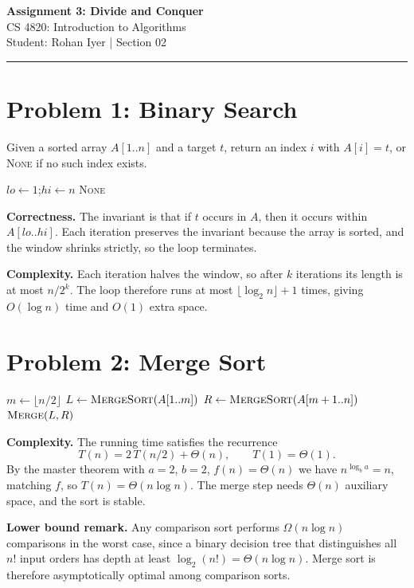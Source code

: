 \documentclass[11pt]{article}
\begin{document}
\begin{center}
  {\Large\bfseries Assignment 3: Divide and Conquer}\\[3pt]
  {\large CS 4820: Introduction to Algorithms}\\[3pt]
  Student: Rohan Iyer \quad | \quad Section 02
\end{center}

{\color{accent}\rule{\linewidth}{1.2pt}}

\section*{Problem 1: Binary Search}

Given a sorted array $A[1..n]$ and a target $t$, return an index $i$ with
$A[i] = t$, or \textsc{None} if no such index exists.

\begin{algorithm}[h]
\caption{\textsc{BinarySearch}$(A, t)$}
$lo \leftarrow 1$;\quad $hi \leftarrow n$\;
\Return \textsc{None}\;
\end{algorithm}

\textbf{Correctness.} The invariant is that if $t$ occurs in $A$, then it
occurs within $A[lo..hi]$. Each iteration preserves the invariant because
the array is sorted, and the window shrinks strictly, so the loop
terminates.

\textbf{Complexity.} Each iteration halves the window, so after $k$
iterations its length is at most $n / 2^{k}$. The loop therefore runs at
most $\lfloor \log_2 n \rfloor + 1$ times, giving $O(\log n)$ time and
$O(1)$ extra space.

\section*{Problem 2: Merge Sort}

\begin{algorithm}[h]
\caption{\textsc{MergeSort}$(A)$}
$m \leftarrow \lfloor n/2 \rfloor$\;
$L \leftarrow \textsc{MergeSort}(A[1..m])$\;
$R \leftarrow \textsc{MergeSort}(A[m+1..n])$\;
\Return $\textsc{Merge}(L, R)$ 
\end{algorithm}

\textbf{Complexity.} The running time satisfies the recurrence
\[
  T(n) = 2\,T(n/2) + \Theta(n), \qquad T(1) = \Theta(1).
\]
By the master theorem with $a = 2$, $b = 2$, $f(n) = \Theta(n)$ we have
$n^{\log_b a} = n$, matching $f$, so $T(n) = \Theta(n \log n)$. The merge
step needs $\Theta(n)$ auxiliary space, and the sort is stable.

\textbf{Lower bound remark.} Any comparison sort performs
$\Omega(n \log n)$ comparisons in the worst case, since a binary decision
tree that distinguishes all $n!$ input orders has depth at least
$\log_2(n!) = \Theta(n \log n)$. Merge sort is therefore asymptotically
optimal among comparison sorts.
\end{document}
